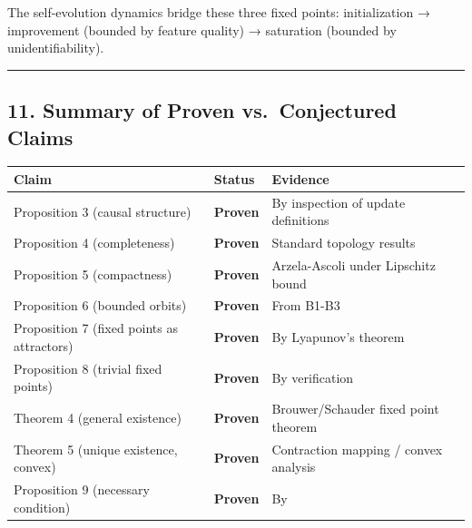 \documentclass[
  12pt,
]{ctexart}
\begin{document}
The self-evolution dynamics bridge these three fixed points:
initialization → improvement (bounded by feature quality) → saturation
(bounded by unidentifiability).

\begin{center}\rule{0.5\linewidth}{0.5pt}\end{center}

\subsection{11. Summary of Proven vs.~Conjectured
Claims}\label{summary-of-proven-vs.-conjectured-claims}

\begin{longtable}[]{@{}
  >{\raggedright\arraybackslash}p{}
  >{\raggedright\arraybackslash}p{}
  >{\raggedright\arraybackslash}p{}@{}}
\toprule\noalign{}
\begin{minipage}[b]{\linewidth}\raggedright
Claim
\end{minipage} & \begin{minipage}[b]{\linewidth}\raggedright
Status
\end{minipage} & \begin{minipage}[b]{\linewidth}\raggedright
Evidence
\end{minipage} \\
\midrule\noalign{}
\endhead
\bottomrule\noalign{}
\endlastfoot
Proposition 3 (causal structure) & \textbf{Proven} & By inspection of
update definitions \\
Proposition 4 (completeness) & \textbf{Proven} & Standard topology
results \\
Proposition 5 (compactness) & \textbf{Proven} & Arzela-Ascoli under
Lipschitz bound \\
Proposition 6 (bounded orbits) & \textbf{Proven} & From B1-B3 \\
Proposition 7 (fixed points as attractors) & \textbf{Proven} & By
Lyapunov's theorem \\
Proposition 8 (trivial fixed points) & \textbf{Proven} & By
verification \\
Theorem 4 (general existence) & \textbf{Proven} & Brouwer/Schauder fixed
point theorem \\
Theorem 5 (unique existence, convex) & \textbf{Proven} & Contraction
mapping / convex analysis \\
Proposition 9 (necessary condition) & \textbf{Proven} & By

\end{longtable}
\end{document}
